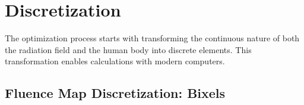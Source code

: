 
\section{Discretization}
The optimization process starts with transforming the continuous nature of both the radiation field and the human body into discrete elements.
This transformation enables calculations with modern computers.

\subsection[Bixels]{Fluence Map Discretization: Bixels}


